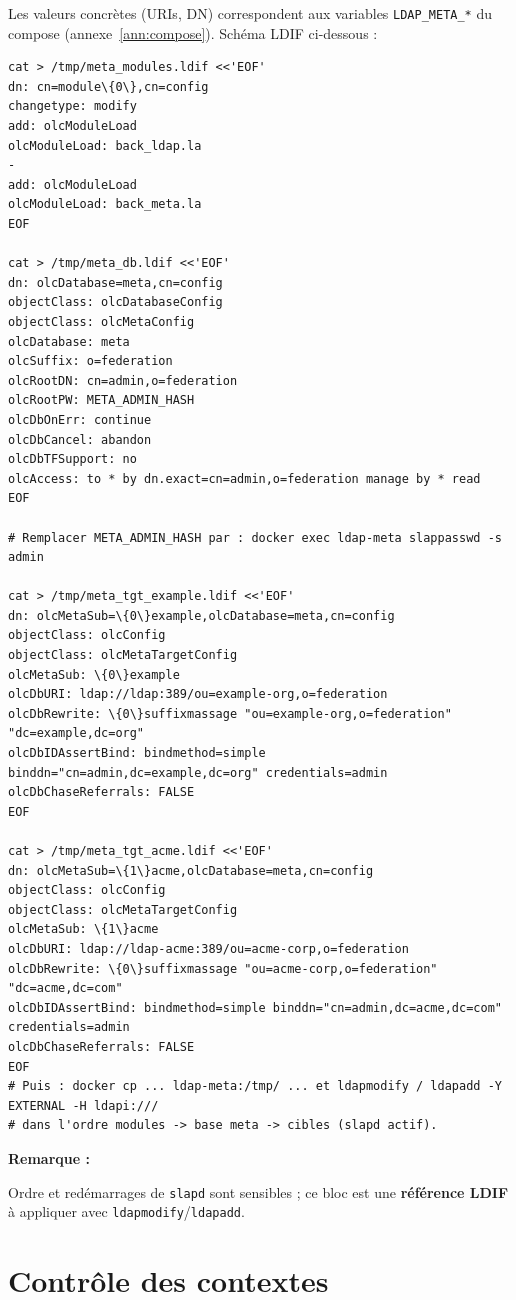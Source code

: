\documentclass[11pt,a4paper]{report}
\newenvironment{nota}{%
  \par\medskip\noindent
  \begin{lrbox}{\notabox}%
  \begin{minipage}{0.97\linewidth}%
  \small
  \textbf{Remarque :}~%
}{%
  \end{minipage}%
  \end{lrbox}%
  {\setlength{\fboxsep}{6pt}%
   \fcolorbox{black!15}{black!3}{\usebox{\notabox}}}%
  \par\medskip
}
\begin{document}
Les valeurs concrètes (URIs, DN) correspondent aux variables \texttt{LDAP\_META\_*} du compose (annexe~\ref{ann:compose}). Schéma LDIF ci-dessous :

\begin{lstlisting}[style=bashstyle]
cat > /tmp/meta_modules.ldif <<'EOF'
dn: cn=module\{0\},cn=config
changetype: modify
add: olcModuleLoad
olcModuleLoad: back_ldap.la
-
add: olcModuleLoad
olcModuleLoad: back_meta.la
EOF

cat > /tmp/meta_db.ldif <<'EOF'
dn: olcDatabase=meta,cn=config
objectClass: olcDatabaseConfig
objectClass: olcMetaConfig
olcDatabase: meta
olcSuffix: o=federation
olcRootDN: cn=admin,o=federation
olcRootPW: META_ADMIN_HASH
olcDbOnErr: continue
olcDbCancel: abandon
olcDbTFSupport: no
olcAccess: to * by dn.exact=cn=admin,o=federation manage by * read
EOF

# Remplacer META_ADMIN_HASH par : docker exec ldap-meta slappasswd -s admin

cat > /tmp/meta_tgt_example.ldif <<'EOF'
dn: olcMetaSub=\{0\}example,olcDatabase=meta,cn=config
objectClass: olcConfig
objectClass: olcMetaTargetConfig
olcMetaSub: \{0\}example
olcDbURI: ldap://ldap:389/ou=example-org,o=federation
olcDbRewrite: \{0\}suffixmassage "ou=example-org,o=federation" "dc=example,dc=org"
olcDbIDAssertBind: bindmethod=simple binddn="cn=admin,dc=example,dc=org" credentials=admin
olcDbChaseReferrals: FALSE
EOF

cat > /tmp/meta_tgt_acme.ldif <<'EOF'
dn: olcMetaSub=\{1\}acme,olcDatabase=meta,cn=config
objectClass: olcConfig
objectClass: olcMetaTargetConfig
olcMetaSub: \{1\}acme
olcDbURI: ldap://ldap-acme:389/ou=acme-corp,o=federation
olcDbRewrite: \{0\}suffixmassage "ou=acme-corp,o=federation" "dc=acme,dc=com"
olcDbIDAssertBind: bindmethod=simple binddn="cn=admin,dc=acme,dc=com" credentials=admin
olcDbChaseReferrals: FALSE
EOF
# Puis : docker cp ... ldap-meta:/tmp/ ... et ldapmodify / ldapadd -Y EXTERNAL -H ldapi:///
# dans l'ordre modules -> base meta -> cibles (slapd actif).
\end{lstlisting}

\begin{nota}
Ordre et redémarrages de \texttt{slapd} sont sensibles ; ce bloc est une \textbf{référence LDIF} à appliquer avec \texttt{ldapmodify}/\texttt{ldapadd}.
\end{nota}

\section{Contrôle des contextes}
\end{document}
